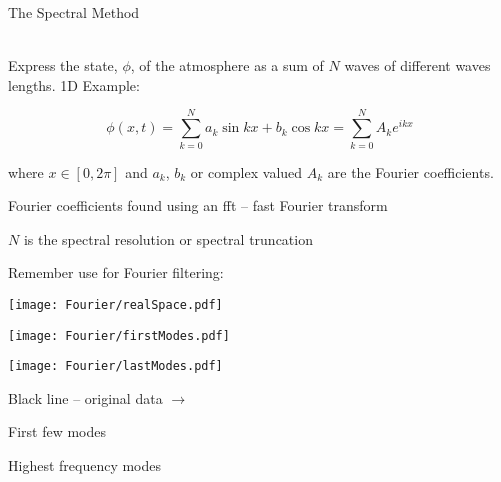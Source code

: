 \begin{slide}{The Spectral Method}

\ \\
Express the state, $\phi$, of the atmosphere as a sum of $N$ waves of different waves lengths. 1D Example:

\[
\phi(x,t) = \sum_{k=0}^{N} a_k \sin kx + b_k \cos kx = \sum_{k=0}^N A_k e^{ikx}
\]

where $x\in[0, 2\pi]$ and $a_k$, $b_k$ or complex valued $A_k$ are the Fourier coefficients.

Fourier coefficients found using an fft -- fast Fourier transform

$N$ is the spectral resolution or spectral truncation

Remember use for Fourier filtering:\\
\begin{minipage}{0.32\linewidth}
\texttt{[image: Fourier/realSpace.pdf]}
\end{minipage}
%
\begin{minipage}{0.32\linewidth}
\texttt{[image: Fourier/firstModes.pdf]}
\end{minipage}
%
\begin{minipage}{0.32\linewidth}
\texttt{[image: Fourier/lastModes.pdf]}
\end{minipage}

\begin{minipage}[t]{0.38\linewidth}\centering
Black line -- original data $\rightarrow$
\end{minipage}
%
\begin{minipage}[t]{0.23\linewidth}\centering
First few modes
\end{minipage}
%
\begin{minipage}[t]{0.37\linewidth}\centering
Highest frequency modes
\end{minipage}
\end{slide}

